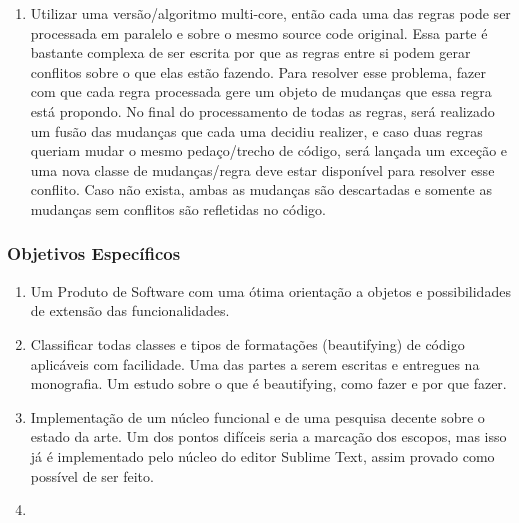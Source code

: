 \begin{englishtext}
\begin{enumerate}[leftmargin=*]
        \item

        Utilizar uma versão/algoritmo multi-core, então cada uma das regras pode ser processada em
        paralelo e sobre o mesmo source code original. Essa parte é bastante complexa de ser escrita
        por que as regras entre si podem gerar conflitos sobre o que elas estão fazendo. Para
        resolver esse problema, fazer com que cada regra processada gere um objeto de mudanças que
        essa regra está propondo. No final do processamento de todas as regras, será realizado um
        fusão das mudanças que cada uma decidiu realizer, e caso duas regras queriam mudar o mesmo
        pedaço/trecho de código, será lançada um exceção e uma nova classe de mudanças/regra deve
        estar disponível para resolver esse conflito. Caso não exista, ambas as mudanças são
        descartadas e somente as mudanças sem conflitos são refletidas no código.

    \end{enumerate}


\subsubsection{Objetivos Específicos}


    \begin{enumerate}[leftmargin=*]

        \item

        Um Produto de Software com uma ótima orientação a objetos e possibilidades de extensão das
        funcionalidades.

        \item

        Classificar todas classes e tipos de formatações (beautifying) de código aplicáveis com
        facilidade. Uma das partes a serem escritas e entregues na monografia. Um estudo sobre o que
        é beautifying, como fazer e por que fazer.

        \item

        Implementação de um núcleo funcional e de uma pesquisa decente sobre o estado da arte. Um
        dos pontos difíceis seria a marcação dos escopos, mas isso já é implementado pelo núcleo do
        editor Sublime Text, assim provado como possível de ser feito.

        \item


\end{enumerate}
\end{englishtext}
